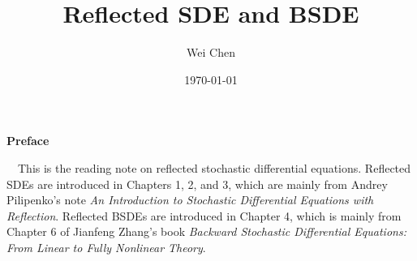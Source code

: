 \documentclass[12pt,oneside]{book}
\title{{\Large{\textbf{Reflected SDE and BSDE}}}}
\author{Wei Chen}
\date{\today}
\theoremstyle{definition}
\theoremstyle{remark}
\newcommand{\1}{\mathbf 1}
\theoremstyle{warn}
\begin{document}
	\maketitle
	\allowdisplaybreaks
	\setcounter{page}{1}
	\begin{center}
		\textbf{\Large Preface} 
        
              
    \end{center}~\
    This is the reading note on reflected stochastic differential equations. Reflected SDEs are introduced in Chapters 1, 2, and 3, which are mainly from Andrey Pilipenko's note \textit{An Introduction to Stochastic Differential Equations with Reflection}. Reflected BSDEs are introduced in Chapter 4, which is mainly from Chapter 6 of Jianfeng Zhang's book \textit{Backward Stochastic Differential Equations: From Linear to Fully Nonlinear Theory}.  
	
	
	\newpage
	\tableofcontents
	\clearpage
    
    
    
    
\end{document}
